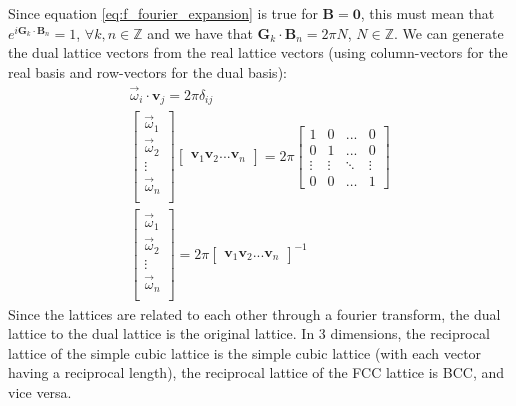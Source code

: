 \documentclass[12pt]{article}
\begin{document}
Since equation \ref{eq:f_fourier_expansion} is true for $\mathbf{B} = \mathbf{0}$, this must mean that $e^{i\mathbf G_k\cdot \mathbf B_n} = 1$, $\forall k, n \in \mathbb{Z} $ and we have that $\mathbf G_k \cdot \mathbf B_n = 2\pi N$, $N\in \mathbb{Z}$. We can generate the dual lattice vectors from the real lattice vectors (using column-vectors for the real basis and row-vectors for the dual basis): 
\begin{gather}
	\vec{\omega}_i\cdot \mathbf{v}_j = 2\pi\delta_{ij} \\
	\begin{bmatrix} 
		\vec{\omega}_1 \\
		\vec{\omega}_2 \\
		\vdots \\
		\vec{\omega}_n \\
	\end{bmatrix}
	\begin{bmatrix}
		\mathbf{v}_1
		\mathbf{v}_2
		...
		\mathbf{v}_n
	\end{bmatrix} = 2\pi
	\begin{bmatrix}
		1 & 0  & ... & 0 \\
		0 & 1 &  ... & 0  \\
		\vdots & \vdots & \ddots & \vdots \\
		0 & 0 & \hdots & 1 
	\end{bmatrix}
	\\
	\begin{bmatrix} 
		\vec{\omega}_1 \\
		\vec{\omega}_2 \\
		\vdots \\
		\vec{\omega}_n \\
	\end{bmatrix}
	= 2\pi
	\begin{bmatrix}
		\mathbf{v}_1
		\mathbf{v}_2
		...
		\mathbf{v}_n
	\end{bmatrix} ^{-1}
\end{gather}
Since the lattices are related to each other through a fourier transform, the dual lattice to the dual lattice is the original lattice.
In 3 dimensions, the reciprocal lattice of the simple cubic lattice is the simple cubic lattice 
(with each vector having a reciprocal length), the reciprocal lattice of the FCC lattice is BCC, and vice versa.
\end{document}
